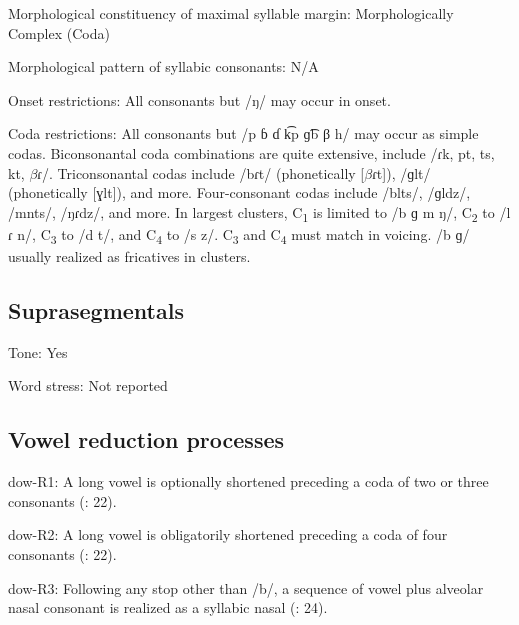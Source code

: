{\begin{appendixdesc}
\item[Morphological constituency of maximal syllable margin:] Morphologically Complex (Coda)

\item[Morphological pattern of syllabic consonants:] N/A

\item[Onset restrictions:] All consonants but /ŋ/ may occur in onset.

\item[Coda restrictions:] All consonants but /p ɓ ɗ k͡p ɡ͡b β h/ may occur as simple codas. Biconsonantal coda combinations are quite extensive, include /ɾk, pt, ts, kt, $\beta ɾ$/. Triconsonantal codas include /bɾt/ (phonetically [$\beta ɾ$t]), /ɡlt/ (phonetically [ɣlt]), and more. Four-consonant codas include /blts/, /ɡldz/, /mnts/, /ŋɾdz/, and more. In largest clusters, C\textsubscript{1} is limited to /b ɡ m ŋ/, C\textsubscript{2} to /l ɾ n/, C\textsubscript{3} to /d t/, and C\textsubscript{4} to /s z/. C\textsubscript{3} and C\textsubscript{4} must match in voicing. /b ɡ/ usually realized as fricatives in clusters.
\end{appendixdesc}
\subsection*{Suprasegmentals}
\begin{appendixdesc}
\item[Tone:] Yes

\item[Word stress:] Not reported
\end{appendixdesc}
\subsection*{Vowel reduction processes}
\begin{appendixdesc}

\item[dow-R1:] A long vowel is optionally shortened preceding a coda of two or three consonants (\citealt{WieringWiering1994}: 22).

\item[dow-R2:] A long vowel is obligatorily shortened preceding a coda of four consonants (\citealt{WieringWiering1994}: 22).

\item[dow-R3:] Following any stop other than /b/, a sequence of vowel plus alveolar nasal consonant is realized as a syllabic nasal (\citealt{WieringWiering1994}: 24).
\end{appendixdesc}
}
